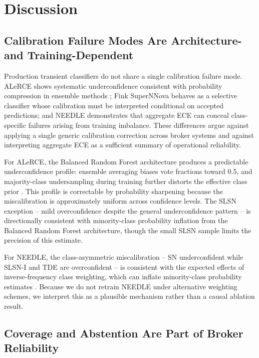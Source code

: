 \documentclass[twocolumn]{aastex631}
\begin{document}
\section{Discussion} \label{sec:discussion}

\subsection{Calibration Failure Modes Are Architecture- and
Training-Dependent}\label{sec:disc_architecture}

Production transient classifiers do not share a single calibration
failure mode. ALeRCE shows systematic underconfidence consistent
with probability compression in ensemble methods
\citep{niculescumizil2005, bostrom2008}; Fink SuperNNova behaves
as a selective classifier whose calibration must be interpreted
conditional on accepted predictions; and NEEDLE demonstrates that
aggregate ECE can conceal class-specific failures arising from
training imbalance. These differences argue against applying a
single generic calibration correction across broker systems and
against interpreting aggregate ECE as a sufficient summary of
operational reliability.

For ALeRCE, the Balanced Random Forest architecture produces a
predictable underconfidence profile: ensemble averaging biases
vote fractions toward 0.5, and majority-class undersampling during
training further distorts the effective class prior
\citep{vandengoorbergh2022}. This profile is correctable by
probability sharpening because the miscalibration is approximately
uniform across confidence levels. The SLSN exception -- mild
overconfidence despite the general underconfidence pattern -- is
directionally consistent with minority-class probability inflation
from the Balanced Random Forest architecture, though the small
SLSN sample limits the precision of this estimate.

For NEEDLE, the class-asymmetric miscalibration -- SN underconfident
while SLSN-I and TDE are overconfident -- is consistent with the
expected effects of inverse-frequency class weighting, which can
inflate minority-class probability estimates
\citep{vandengoorbergh2022}. Because we do not retrain NEEDLE
under alternative weighting schemes, we interpret this as a
plausible mechanism rather than a causal ablation result.

\subsection{Coverage and Abstention Are Part of Broker
Reliability}\label{sec:disc_coverage}
\end{document}
